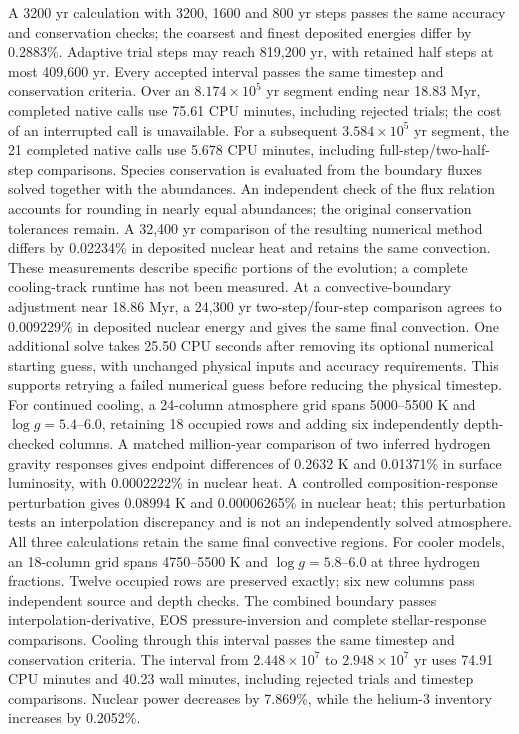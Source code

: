\documentclass[11pt,letterpaper]{article}
\begin{document}
A 3200 yr calculation with 3200, 1600 and 800 yr steps passes the same
accuracy and conservation checks; the coarsest and finest deposited energies
differ by 0.2883\%. Adaptive trial steps may reach 819,200 yr, with retained
half steps at most 409,600 yr. Every accepted interval passes the same timestep and conservation
criteria. Over an $8.174\times10^5$ yr segment ending near 18.83 Myr,
completed native calls use 75.61 CPU minutes, including rejected trials;
the cost of an interrupted call is unavailable.
For a subsequent $3.584\times10^5$ yr segment, the 21 completed native calls
use 5.678 CPU minutes, including full-step/two-half-step comparisons.
Species conservation is evaluated from the boundary fluxes solved together
with the abundances. An independent check of the flux relation accounts for
rounding in nearly equal abundances; the original conservation tolerances
remain. A 32,400 yr comparison of the resulting numerical method differs
by 0.02234\% in deposited nuclear heat and retains the same convection.
These measurements describe specific portions of the evolution; a complete
cooling-track runtime has not been measured.
At a convective-boundary adjustment near 18.86 Myr, a 24,300 yr two-step/four-step
comparison agrees to 0.009229\% in deposited nuclear energy and gives the
same final convection. One additional solve takes 25.50 CPU seconds after
removing its optional numerical starting guess, with unchanged physical
inputs and accuracy requirements. This supports retrying a failed numerical
guess before reducing the physical timestep.
For continued cooling, a 24-column atmosphere grid spans 5000--5500 K
and $\log g=5.4$--6.0, retaining 18 occupied rows and adding six independently
depth-checked columns. A matched million-year comparison of two inferred
hydrogen gravity responses gives endpoint differences of 0.2632 K and
0.01371\% in surface luminosity, with 0.0002222\% in nuclear heat.
A controlled composition-response perturbation gives 0.08994 K and
0.00006265\% in nuclear heat; this perturbation tests an interpolation
discrepancy and is not an independently solved atmosphere. All three
calculations retain the same final convective regions.
For cooler models, an 18-column grid spans 4750--5500 K and
$\log g=5.8$--6.0 at three hydrogen fractions. Twelve occupied rows are
preserved exactly; six new columns pass independent source and depth checks.
The combined boundary passes interpolation-derivative, EOS pressure-inversion
and complete stellar-response comparisons. Cooling through this interval
passes the same timestep and conservation criteria. The interval from $2.448\times10^7$ to $2.948\times10^7$ yr uses 74.91 CPU minutes and 40.23 wall minutes, including rejected
trials and timestep comparisons. Nuclear power decreases by 7.869\%, while
the helium-3 inventory increases by 0.2052\%.
\end{document}
